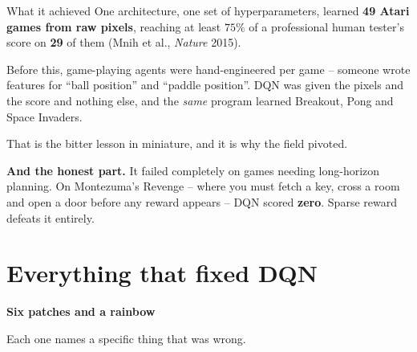 \documentclass[aspectratio=169]{beamer}
\begin{document}
\begin{frame}{What it achieved}
  \small
  One architecture, one set of hyperparameters, learned \textbf{49 Atari games from raw pixels},
  reaching at least $75\%$ of a professional human tester's score on \textbf{29} of them
  (Mnih et al., \emph{Nature} 2015).

  \vskip 8pt
  \begin{tcolorbox}[colback=armblue!8, colframe=armblue, boxrule=0.6pt, arc=2pt,
                    title={\textbf{Why this was the shock, and it was not the scores}}]
    \small
    Before this, game-playing agents were hand-engineered per game -- someone wrote features for
    ``ball position'' and ``paddle position''. DQN was given the pixels and the score and
    nothing else, and the \emph{same} program learned Breakout, Pong and Space Invaders.

    \vskip 4pt
    That is the bitter lesson in miniature, and it is why the field pivoted.
  \end{tcolorbox}

  \vskip 8pt
  \begin{tcolorbox}[colback=armred!8, colframe=armred, boxrule=0.6pt, arc=2pt]
    \small
    \textbf{And the honest part.} It failed completely on games needing long-horizon planning.
    On Montezuma's Revenge -- where you must fetch a key, cross a room and open a door before
    any reward appears -- DQN scored \textbf{zero}. Sparse reward defeats it entirely.
  \end{tcolorbox}
\end{frame}

\section{Everything that fixed DQN}
\begin{frame}[plain]
  \begin{center}
    \vskip 1.6cm
    {\Huge\bfseries\color{popblue}Six patches and a rainbow}

    \vskip 0.6cm
    {\large Each one names a specific thing that was wrong.}
  \end{center}
\end{frame}
\end{document}
